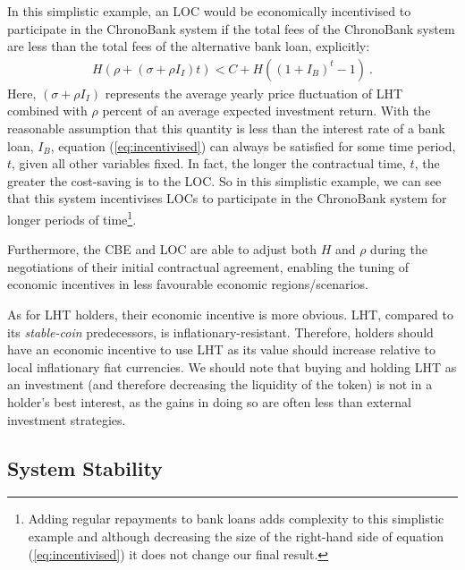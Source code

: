 \begin{multicols}{2}
In this simplistic example, an LOC would be economically incentivised to participate in the ChronoBank system if the total fees of the ChronoBank system are less than the total fees of the alternative bank loan, explicitly:
\begin{equation}
  \begin{aligned}
H( \rho + (\sigma + \rho I_I) t) < C + H \left( (1 + I_B)^t -1 \right) ~.
\end{aligned}
  \label{eq:incentivised}
\end{equation}
Here, $(\sigma + \rho I_I)$ represents the average yearly price fluctuation of LHT combined with $\rho$ percent of an average expected investment return. With the reasonable assumption that this quantity is less than the interest rate of a bank loan, $I_B$, equation (\ref{eq:incentivised}) can always be satisfied for some time period, $t$, given all other variables fixed. In fact, the longer the contractual time, $t$, the greater the cost-saving is to the LOC. So in this simplistic example, we can see that this system incentivises LOCs to participate in the ChronoBank system for longer periods of time\footnote{Adding regular repayments to bank loans adds complexity to this simplistic example and although decreasing the size of the right-hand side of equation (\ref{eq:incentivised}) it does not change our final result.}. 

Furthermore, the CBE and LOC are able to adjust both $H$ and $\rho$ during the negotiations of their initial contractual agreement, enabling the tuning of economic incentives in less favourable economic regions/scenarios. 

As for LHT holders, their economic incentive is more obvious. LHT, compared to its \textit{stable-coin} predecessors, is inflationary-resistant. Therefore, holders should have an economic incentive to use LHT as its value should increase relative to local inflationary fiat currencies. We should note that buying and holding LHT as an investment (and therefore decreasing the liquidity of the token) is not in a holder's best interest, as the gains in doing so are often less than external investment strategies.  

\subsection{System Stability}


\end{multicols}
